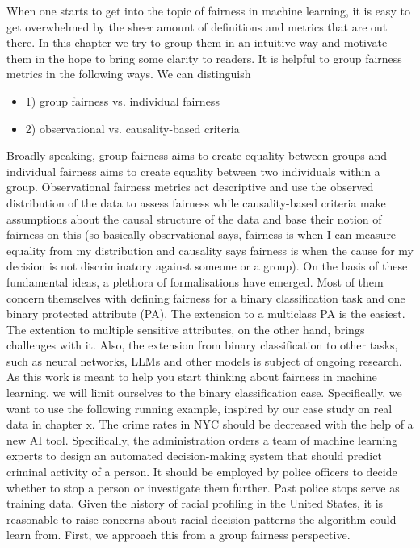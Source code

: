 When one starts to get into the topic of fairness in machine learning, it is easy to get overwhelmed by the sheer amount of definitions and metrics that are out there. In this chapter we try to group them in an intuitive way and motivate them in the hope to bring some clarity to readers. It is helpful to group fairness metrics in the following ways.
We can distinguish
\begin{itemize}
    \item 1) group fairness vs. individual fairness
    \item 2) observational vs. causality-based criteria \cite{castelnovo2022}
\end{itemize}

Broadly speaking, group fairness aims to create equality between groups and individual fairness aims to create equality between two individuals within a group. Observational fairness metrics act descriptive and use the observed distribution of the data to assess fairness while causality-based criteria make assumptions about the causal structure of the data and base their notion of fairness on this (so basically observational says, fairness is when I can measure equality from my distribution and causality says fairness is when the cause for my decision is not discriminatory against someone or a group). On the basis of these fundamental ideas, a plethora of formalisations have emerged. Most of them concern themselves with defining fairness for a binary classification task and one binary protected attribute (PA).
The extension to a multiclass PA is the easiest. The extention to multiple sensitive attributes, on the other hand, brings challenges with it. Also, the extension from binary classification to other tasks, such as neural networks, LLMs and other models is subject of ongoing research. As this work is meant to help you start thinking about fairness in machine learning, we will limit ourselves to the binary classification case.
Specifically, we want to use the following running example, inspired by our case study on real data in chapter x. The crime rates in NYC should be decreased with the help of a new AI tool. Specifically, the administration orders a team of machine learning experts to design an automated decision-making system that should predict criminal activity of a person. It should be employed by police officers to decide whether to stop a person or investigate them further. Past police stops serve as training data. Given the history of racial profiling in the United States, it is reasonable to raise concerns about racial decision patterns the algorithm could learn from. First, we approach this from a group fairness perspective.

